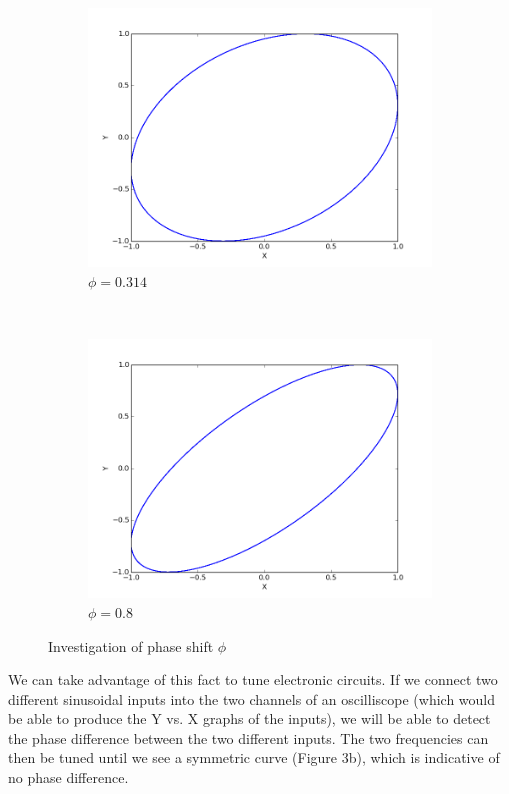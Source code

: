 \documentclass{article}
\begin{document}
\begin{enumerate}
\begin{figure}[h]
		\begin{subfigure}{0.4\textwidth}
		\centering
		\includegraphics[width=0.9\linewidth]{fig10.png}
		\caption{$\phi = 0.314$}
		\end{subfigure}
		~
		\begin{subfigure}{0.4\textwidth}
		\centering
		\includegraphics[width=0.9\linewidth]{fig11.png}
		\caption{$\phi = 0.8$}
		\end{subfigure}
		
		\caption{Investigation of phase shift $\phi$}
		
	\end{figure}
	
	We can take advantage of this fact to tune electronic circuits. If we connect two different sinusoidal inputs into the two channels of an oscilliscope (which would be able to produce the Y vs. X graphs of the inputs), we will be able to detect the phase difference between the two different inputs. The two frequencies can then be tuned until we see a symmetric curve (Figure 3b), which is indicative of no phase difference.


\end{enumerate}
\end{document}

